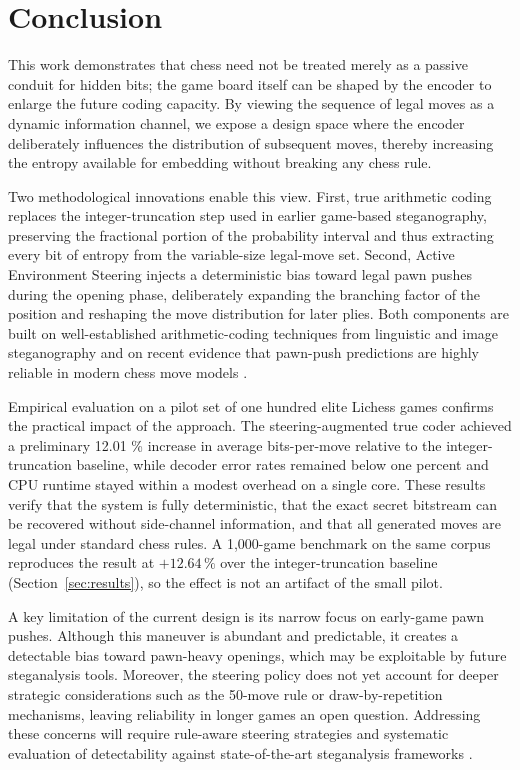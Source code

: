 \documentclass[journal]{IEEEtran}
\begin{document}
\section{Conclusion}\label{sec:conclusion}
This work demonstrates that chess need not be treated merely as a passive conduit for hidden bits; the game board itself can be shaped by the encoder to enlarge the future coding capacity. By viewing the sequence of legal moves as a dynamic information channel, we expose a design space where the encoder deliberately influences the distribution of subsequent moves, thereby increasing the entropy available for embedding without breaking any chess rule.

Two methodological innovations enable this view. First, true arithmetic coding replaces the integer-truncation step used in earlier game-based steganography, preserving the fractional portion of the probability interval and thus extracting every bit of entropy from the variable-size legal-move set. Second, Active Environment Steering injects a deterministic bias toward legal pawn pushes during the opening phase, deliberately expanding the branching factor of the position and reshaping the move distribution for later plies. Both components are built on well-established arithmetic-coding techniques from linguistic and image steganography and on recent evidence that pawn-push predictions are highly reliable in modern chess move models \cite{shen2020nearimpercepti, baraskar2018truecolor, walker2026chessworld, durge2026crossdataset}.

Empirical evaluation on a pilot set of one hundred elite Lichess games confirms the practical impact of the approach. The steering-augmented true coder achieved a preliminary 12.01 \% increase in average bits-per-move relative to the integer-truncation baseline, while decoder error rates remained below one percent and CPU runtime stayed within a modest overhead on a single core. These results verify that the system is fully deterministic, that the exact secret bitstream can be recovered without side-channel information, and that all generated moves are legal under standard chess rules. A 1,000-game benchmark on the same corpus reproduces the result at $+12.64\,\%$ over the integer-truncation baseline (Section~\ref{sec:results}), so the effect is not an artifact of the small pilot.

A key limitation of the current design is its narrow focus on early-game pawn pushes. Although this maneuver is abundant and predictable, it creates a detectable bias toward pawn-heavy openings, which may be exploitable by future steganalysis tools. Moreover, the steering policy does not yet account for deeper strategic considerations such as the 50-move rule or draw-by-repetition mechanisms, leaving reliability in longer games an open question. Addressing these concerns will require rule-aware steering strategies and systematic evaluation of detectability against state-of-the-art steganalysis frameworks \cite{setiadi2025poweredstegano, driss2025steganographyi, ismaiel2026taxonomydriven}.
\end{document}
